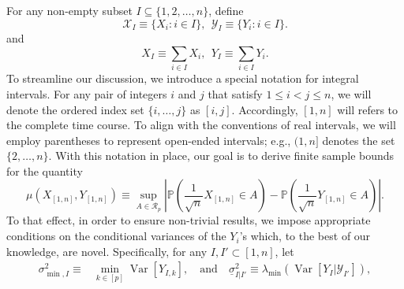 \documentclass[10pt,a4paper]{amsart}
\newcommand{\violet}[1]{{\color{violet}#1}}
\newcommand{\commhb}[1]{{\textbf{{\violet{{[HB: #1]}}}}}}
\theoremstyle{plain}
\theoremstyle{remark}
\newcommand{\ints}{\ensuremath{\mathbb{Z}}}
\newcommand{\cmpl}{\mathsf{C}}
\newcommand{\Exp}{\mathbb{E}}	%
\newcommand{\Var}{\operatorname{Var}}	%
\begin{document}
\setcounter{equation}{3}
For any non-empty subset $I \subseteq \{1, 2, \ldots, n\}$, define
\begin{equation*}
    \mathscr{X}_I \equiv \{ X_i: i \in I \}, ~~
    \mathscr{Y}_I \equiv \{ Y_i: i \in I \}.
\end{equation*}
and
\begin{equation} \label{eq:X_I_Y_I}
    X_I \equiv \sum_{i \in I} X_i, ~~
    Y_I \equiv \sum_{i \in I} Y_i.
\end{equation}
To streamline our discussion, we introduce a special notation for integral intervals. For any pair of integers $i$ and $j$ that satisfy $1 \leq i < j \leq n$, we will denote the ordered index set $\{i, \dots, j\}$ as $[i,j]$. Accordingly, $[1,n]$ will refers to the complete time course. To align with the conventions of real intervals, we will employ parentheses to represent open-ended intervals; e.g., $(1,n]$ denotes the set $\{2, \dots, n\}$. %
With this notation in place, our goal is to derive finite sample bounds for the  quantity
\begin{equation}\label{eq:mu}
\mu\left( X_{[1,n]}, Y_{[1,n]} \right) \equiv \sup_{A \in \mathcal{R}_p} \left| \mathbb{P} \left( \frac{1}{\sqrt{n}} X_{[1,n]} \in A \right) - \mathbb{P} \left( \frac{1}{\sqrt{n}} Y_{[1,n]} \in A \right) \right|.
\end{equation}
To that effect, in order to ensure non-trivial results, we impose appropriate conditions on the conditional variances of the $Y_i$'s which, to the best of our knowledge, are novel. 
Specifically, for any $I, I' \subset [1,n]$, let %
\begin{equation*} \begin{aligned}
    {\sigma}^2_{\min,I} \equiv
    & \min_{k \in [p]} \Var[Y_{I,k}], 
    \quad\mbox{and}\quad
    \underline{\sigma}^2_{I|I'} \equiv
     \lambda_{\min}(\Var[Y_{I}|\mathscr{Y}_{I'}]),
\end{aligned} \end{equation*}
\end{document}
